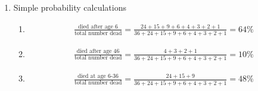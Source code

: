 \begin{enumerate}
	\item Simple probability calculations \\
	
	
		\begin{enumerate}
			\item \begin{align}
				\frac{\text{died after age 6}}{\text{total number dead}} = \frac{24+15+9+6+4+3+2+1}{36+24+15+9+6+4+3+2+1} = 64 \%
			\end{align}
			
			\item \begin{align}
				\frac{\text{died after age 46}}{\text{total number dead}} = 
				\frac{4+3+2+1}{36+24+15+9+6+4+3+2+1} = 10 \%
			\end{align}
			
			\item \begin{align}
				\frac{\text{died at age 6-36}}{\text{total number dead}} = 
				\frac{24+15+9}{36+24+15+9+6+4+3+2+1} = 48 \%
			\end{align}
			
		\end{enumerate}
	
	
\end{enumerate}